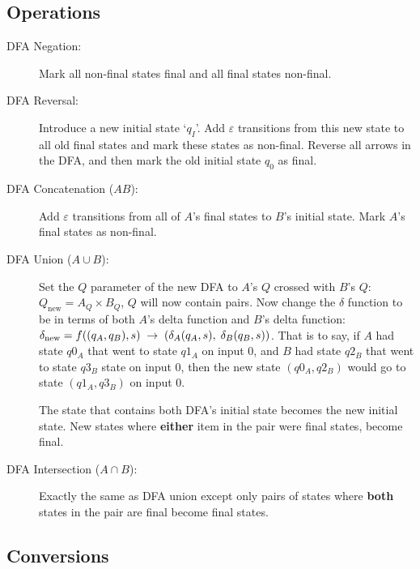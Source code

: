 \subsection{Operations}
\begin{description}
    \item[{\small DFA Negation:}] Mark all non-final states final and all final
    states non-final.

    \item[{\small DFA Reversal:}] Introduce a new initial state `$q_I$'. Add $\varepsilon$
    transitions from this new state to all old final states and mark these states
    as non-final. Reverse all arrows in the DFA, and then mark the old initial
    state $q_0$ as final.

    \item[{\small DFA Concatenation ($AB$):}] Add $\varepsilon$ transitions from
    all of $A$'s final states to $B$'s initial state. Mark $A$'s final states
    as non-final.

    \item[{\small DFA Union ($A \cup B$):}] Set the $Q$ parameter of the new
    DFA to $A$'s $Q$ crossed with $B$'s $Q$: $Q_{\text{new}} = A_Q \times B_Q$, 
    $Q$ will now contain pairs. Now change the $\delta$ function to be in terms 
    of both $A$'s delta function and $B$'s delta function: 
    $\delta_{\text{new}} = f((q_A, q_B), s) \;\to\; (\delta_A(q_A, s),\; \delta_B(q_B, s))$.
    That is to say, if $A$ had state $q0_A$ that went to state $q1_A$ on input 0,
    and $B$ had state $q2_B$ that went to state $q3_B$ state on input 0, then
    the new state $(q0_A, q2_B)$ would go to state $(q1_A, q3_B)$ on input 0.

    The state that contains both DFA's initial state becomes the new initial state.
    New states where \textbf{either} item in the pair were final states, become
    final.
    
    \item[{\small DFA Intersection ($A \cap B$):}] Exactly the same as DFA union
    except only pairs of states where \textbf{both} states in the pair are final
    become final states.
\end{description}

\subsection{Conversions}
\newcommand{\eclose}{\varepsilon\text{-closure}}
